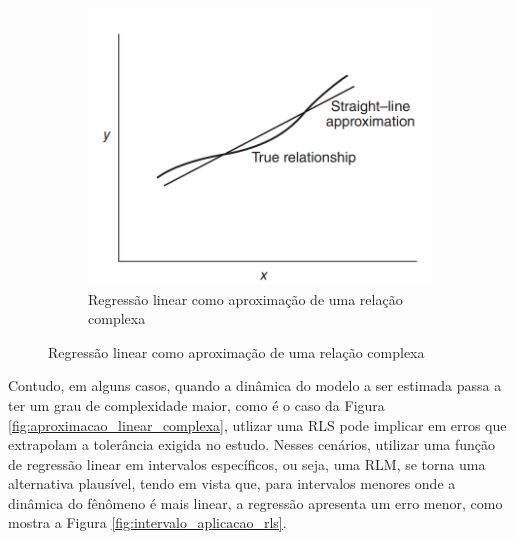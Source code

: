 \begin{figure}[H]
\begin{subfigure}{0.4\textwidth}
		\includegraphics[width=\linewidth]{figuras/linear_regression_approximation_of_a_complex_relationship.png}
		\caption{Regressão linear como aproximação de uma relação complexa}
		\label{fig:regressao_linear_aprox_relacao_complexa}
	\end{subfigure}
	\label{fig:comportamento_regressao_linear}
\end{figure}

Contudo, em alguns casos, quando a dinâmica do modelo a ser estimada passa a ter um grau de complexidade maior, como é o caso da Figura \ref{fig:aproximacao_linear_complexa}, utlizar uma RLS pode implicar em erros que extrapolam a tolerância exigida no estudo. Nesses cenários, utilizar uma função de regressão linear em intervalos específicos, ou seja, uma RLM, se torna uma alternativa plausível, tendo em vista que, para intervalos menores onde a dinâmica do fênômeno é mais linear, a regressão apresenta um erro menor, como mostra a Figura \ref{fig:intervalo_aplicacao_rls}.

